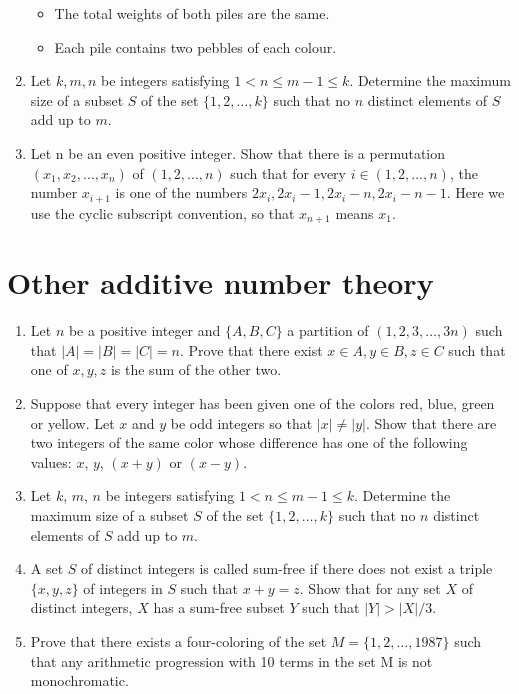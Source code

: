 \documentclass{article}
\begin{document}
\begin{enumerate}
        \begin{itemize}
            \item 
            The total weights of both piles are the same.
            \item
                Each pile contains two pebbles of each colour.
        \end{itemize}
    \item Let $k, m, n$ be integers satisfying $1 < n \le m-1 \le k$. Determine 
        the maximum size of a subset $S$ of the set $\{1, 2, \ldots, k\}$ such that 
        no $n$ distinct elements of $S$ add up to $m$.
    \item Let n be an even positive integer. Show that there is a permutation 
        $(x_1, x_2, \ldots, x_n)$ of $(1, 2, \ldots, n)$ such that for every $i \in (1, 2, \ldots,
        n)$,
        the 
        number $x_{i+1}$ is one of the numbers $2x_i, 2x_i-1, 2x_i-n, 2x_i-n-1$. Here 
        we use the cyclic subscript convention, so that $x_{n+1}$ means $x_1$.  
\end{enumerate}
\section{Other additive number theory}
\begin{enumerate}
    \item Let $n$ be a positive integer and $\{A, B, C\}$ a partition of $(1, 2,
        3, \ldots, 3n)$ such that $|A| = |B| = |C| = n$. 
        Prove that there exist $x \in A, y \in B, z \in C$ such that one of $x,
        y, z$ is the sum of the other two. 
    \item Suppose that every integer has been given one of the colors 
    red, blue, green or yellow. Let $x$ and $y$ be odd integers so that 
    $|x| \ne |y|$. Show that there are two integers of the same color whose difference
    has one of the following values: $x$, $y$, $(x+y)$ or 
    $(x-y)$.  

    \item Let $k$, $m$, $n$ be integers satisfying $1 < n \le m-1 \le k$. Determine 
    the maximum size of a subset $S$ of the set $\{1, 2, \ldots, k\}$ such that 
    no $n$ distinct elements of $S$ add up to $m$.

    \item A set $S$ of distinct integers is called sum-free if there does not 
    exist a triple $\{x, y, z\}$ of integers in $S$ such that $x + y = z$. Show 
    that for any set $X$ of distinct integers, $X$ has a sum-free subset 
    $Y$ such that $|Y| > |X|/3$.

    \item Prove that there exists a four-coloring of the set $M = \{1,2,\ldots,1987\}$
    such that any arithmetic progression with 10 terms in the set M is not
    monochromatic.
\end{enumerate}
\end{document}
